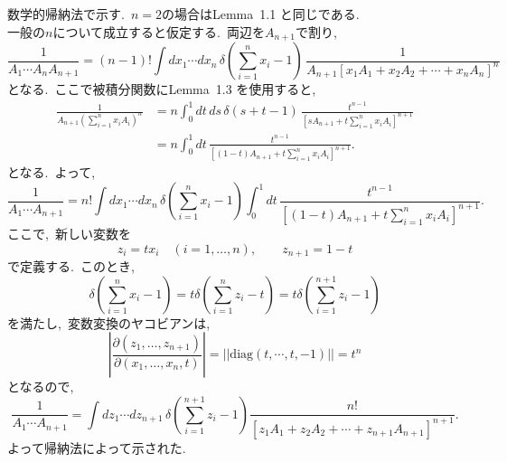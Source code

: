 \documentclass[uplatex,dvipdfmx,a4paper,11pt]{jsarticle}
\begin{document}
\begin{myproof}
  数学的帰納法で示す.~$n=2$の場合はLemma~1.1 と同じである.\\
  一般の$n$について成立すると仮定する.~両辺を$A_{n+1}$で割り,
\[
\frac{1}{A_1\cdots A_nA_{n+1}} = 
(n-1)!\int dx_1\cdots dx_n\,
\delta\!\left(\sum_{i=1}^n x_i-1\right)\,
\frac{1}{A_{n+1}[x_1A_1+x_2A_2+\cdots+x_nA_n]^n}
\]
となる.~ここで被積分関数にLemma~1.3 を使用すると,
\[
\begin{aligned}
\frac{1}{
  A_{n+1}\left(\sum_{i=1}^{n}x_iA_i\right)^n
}
&=
n\int_0^1 dt\,ds\,\delta(s+t-1)\,
\frac{t^{n-1}}{
  \left[sA_{n+1}+t\sum_{i=1}^{n}x_iA_i\right]^{n+1}
}
\\[6pt]
&=
n\int_0^1 dt\,
\frac{t^{n-1}}{
  \left[(1-t)A_{n+1}+t\sum_{i=1}^{n}x_iA_i\right]^{n+1}
}.
\end{aligned}
\]
となる.~よって,~
\[
\frac{1}{A_1\cdots A_{n+1}}
=
n!\int dx_1\cdots dx_n\,
\delta\!\left(\sum_{i=1}^n x_i-1\right)\int_0^1dt\,
\frac{t^{n-1}}
{\left[(1-t)A_{n+1}
+t\sum_{i=1}^n x_iA_i\right]^{n+1}}.
\]
ここで,~新しい変数を
\[
z_i=tx_i\quad(i=1,\ldots,n),
\qquad
z_{n+1}=1-t
\]
で定義する.~このとき,~
\[
\delta\!\left(\sum_{i=1}^n x_i-1\right) = t\delta\!\left(\sum_{i=1}^n z_i-t\right) = t\delta\!\left(\sum_{i=1}^{n+1} z_i-1\right)
\]
を満たし,~変数変換のヤコビアンは,
\[
\left|
\frac{\partial(z_1,\ldots,z_{n+1})}
{\partial(x_1,\ldots,x_{n},t)}
\right|
=||\text{diag}(t,\cdots,t,-1)|| = t^n
\]
となるので,~
\[
\frac{1}{A_1\cdots A_{n+1}}
=\int dz_1\cdots dz_{n+1}\,
\delta\!\left(\sum_{i=1}^{n+1} z_i-1\right)
\frac{n!}
{[z_1A_1+z_2A_2+\cdots+z_{n+1}A_{n+1}]^{n+1}}.
\]
よって帰納法によって示された.~
\end{myproof}
\end{document}
